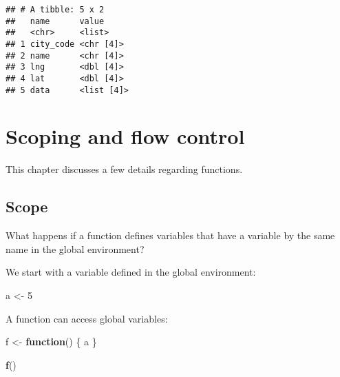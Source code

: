 \documentclass[]{book}
\newenvironment{Shaded}{\begin{snugshade}}{\end{snugshade}}
\newcommand{\ControlFlowTok}[1]{\textcolor[rgb]{0.13,0.29,0.53}{\textbf{#1}}}
\newcommand{\DecValTok}[1]{\textcolor[rgb]{0.00,0.00,0.81}{#1}}
\newcommand{\KeywordTok}[1]{\textcolor[rgb]{0.13,0.29,0.53}{\textbf{#1}}}
\newcommand{\NormalTok}[1]{#1}
\newcommand{\OperatorTok}[1]{\textcolor[rgb]{0.81,0.36,0.00}{\textbf{#1}}}
\newcommand{\StringTok}[1]{\textcolor[rgb]{0.31,0.60,0.02}{#1}}
\begin{document}
\begin{enumerate}
\begin{Shaded}
\end{Shaded}

\begin{verbatim}
## # A tibble: 5 x 2
##   name      value     
##   <chr>     <list>    
## 1 city_code <chr [4]> 
## 2 name      <chr [4]> 
## 3 lng       <dbl [4]> 
## 4 lat       <dbl [4]> 
## 5 data      <list [4]>
\end{verbatim}
\end{enumerate}

\hypertarget{scoping-and-flow-control}{%
\chapter{Scoping and flow control}\label{scoping-and-flow-control}}

This chapter discusses a few details regarding functions.

\hypertarget{scope}{%
\section{Scope}\label{scope}}

What happens if a function defines variables that have a variable by the same name in the global environment?

We start with a variable defined in the global environment:

\begin{Shaded}
\begin{Highlighting}[]
\NormalTok{a <-}\StringTok{ }\DecValTok{5}
\end{Highlighting}
\end{Shaded}

A function can access global variables:

\begin{Shaded}
\begin{Highlighting}[]
\NormalTok{f <-}\StringTok{ }\ControlFlowTok{function}\NormalTok{() \{}
\NormalTok{  a}
\NormalTok{\}}

\KeywordTok{f}\NormalTok{()}
\end{Highlighting}
\end{Shaded}
\end{document}
